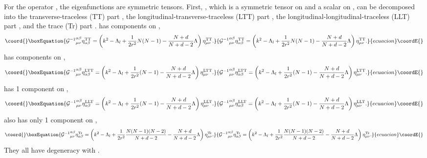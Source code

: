 \documentclass[a4paper,aps,preprint,groupedaddress,showpacs]{revtex4}
\begin{document}
For the operator \coordHE{}, the eigenfunctions are
symmetric tensors. First, \myHighlight{$\eta_{\alpha\beta}$}\coordHE{}, which is a 
symmetric tensor on \coordHE{} and a scalar on \coordHE{}, can
be decomposed \cite{RO} 
into the transverse-traceless (TT) part
\coordHE{}, the 
longitudinal-transverse-traceless (LTT) part 
\coordHE{}, the 
longitudinal-longitudinal-traceless (LLT) part
\coordHE{}, and the
trace (Tr) part \coordHE{}. 
\coordHE{} has \coordHE{} components on 
\coordHE{},
\begin{equation}\coord{}\boxEquation{
{{\cal G}^{-1}}^{\alpha\beta}_{\mu\nu}\eta^{\rm TT}_{\alpha\beta}=
\left(k^{2}-\Lambda_{l}+\frac{1}{2r^{2}}N(N-1)-
\frac{N+d}{N+d-2}\Lambda\right)\eta^{\rm TT}_{\mu\nu}.
}{
{{\cal G}^{-1}}^{\alpha\beta}_{\mu\nu}\eta^{\rm TT}_{\alpha\beta}=
\left(k^{2}-\Lambda_{l}+\frac{1}{2r^{2}}N(N-1)-
\frac{N+d}{N+d-2}\Lambda\right)\eta^{\rm TT}_{\mu\nu}.
}{ecuacion}\coordE{}\end{equation}
\coordHE{} has \coordHE{} components
on \coordHE{},
\begin{equation}\coord{}\boxEquation{
{{\cal G}^{-1}}^{\alpha\beta}_{\mu\nu}\eta^{\rm LTT}_{\alpha\beta}=
\left(k^{2}-\Lambda_{l}+\frac{1}{2r^{2}}(N-1)-
\frac{N+d}{N+d-2}\Lambda\right)\eta^{\rm LTT}_{\mu\nu}.
}{
{{\cal G}^{-1}}^{\alpha\beta}_{\mu\nu}\eta^{\rm LTT}_{\alpha\beta}=
\left(k^{2}-\Lambda_{l}+\frac{1}{2r^{2}}(N-1)-
\frac{N+d}{N+d-2}\Lambda\right)\eta^{\rm LTT}_{\mu\nu}.
}{ecuacion}\coordE{}\end{equation}
\coordHE{} has 1 component on \coordHE{},
\begin{equation}\coord{}\boxEquation{
{{\cal G}^{-1}}^{\alpha\beta}_{\mu\nu}\eta^{\rm LLT}_{\alpha\beta}=
\left(k^{2}-\Lambda_{l}+\frac{1}{2r^{2}}(N-1)-
\frac{N+d}{N+d-2}\Lambda\right)\eta^{\rm LLT}_{\mu\nu}.
}{
{{\cal G}^{-1}}^{\alpha\beta}_{\mu\nu}\eta^{\rm LLT}_{\alpha\beta}=
\left(k^{2}-\Lambda_{l}+\frac{1}{2r^{2}}(N-1)-
\frac{N+d}{N+d-2}\Lambda\right)\eta^{\rm LLT}_{\mu\nu}.
}{ecuacion}\coordE{}\end{equation}
\coordHE{} also has only 1 component on \coordHE{},
\begin{equation}\coord{}\boxEquation{
{{\cal G}^{-1}}^{\alpha\beta}_{\mu\nu}\eta^{\rm Tr}_{\alpha\beta}=
\left(k^{2}-\Lambda_{l}+\frac{1}{2r^{2}}
\frac{N(N-1)(N-2)}{N+d-2}-\frac{N+d}{N+d-2}\Lambda\right)
\eta^{\rm Tr}_{\mu\nu}.
}{
{{\cal G}^{-1}}^{\alpha\beta}_{\mu\nu}\eta^{\rm Tr}_{\alpha\beta}=
\left(k^{2}-\Lambda_{l}+\frac{1}{2r^{2}}
\frac{N(N-1)(N-2)}{N+d-2}-\frac{N+d}{N+d-2}\Lambda\right)
\eta^{\rm Tr}_{\mu\nu}.
}{ecuacion}\coordE{}\end{equation}
They all have degeneracy \coordHE{} with \coordHE{}.
\end{document}
